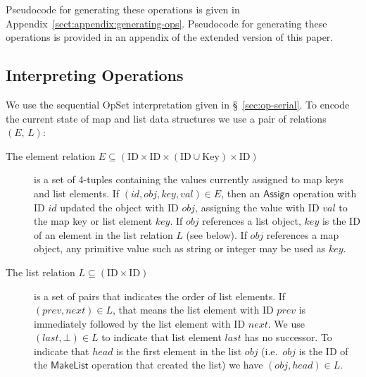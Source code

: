 \ifarxiv
  \noindent
  Pseudocode for generating these operations is given in Appendix~\ref{sect:appendix:generating-ops}.
\else
  \noindent
  Pseudocode for generating these operations is provided in an appendix of the extended version of this paper.
\fi


\subsection{Interpreting Operations}\label{sec:datatypes-interp}

We use the sequential OpSet interpretation given in \S~\ref{sec:op-serial}.
To encode the current state of map and list data structures we use a pair of relations $(E,\, L)$:

\begin{description}
    \item[The element relation $E \subseteq (\mathrm{ID} \times \mathrm{ID} \times (\mathrm{ID} \cup \mathrm{Key}) \times \mathrm{ID})$]
        is a set of 4-tuples containing the values currently assigned to map keys and list elements.
        If $(\mathit{id}, \mathit{obj}, \mathit{key}, \mathit{val}) \in E$, then an $\mathsf{Assign}$ operation with ID $\mathit{id}$ updated the object with ID $\mathit{obj}$, assigning the value with ID $\mathit{val}$ to the map key or list element $\mathit{key}$.
        If $\mathit{obj}$ references a list object, $\mathit{key}$ is the ID of an element in the list relation $L$ (see below).
        If $\mathit{obj}$ references a map object, any primitive value such as string or integer may be used as $\mathit{key}$.
    \item[The list relation $L \subseteq (\mathrm{ID} \times \mathrm{ID})$] is a set of pairs that indicates the order of list elements.
        If $(\mathit{prev}, \mathit{next}) \in L$, that means the list element with ID $\mathit{prev}$ is immediately followed by the list element with ID $\mathit{next}$.
        We use $(\mathit{last}, \bot) \in L$ to indicate that list element $\mathit{last}$ has no successor.
        To indicate that $\mathit{head}$ is the first element in the list $\mathit{obj}$ (i.e.\ $\mathit{obj}$ is the ID of the $\mathsf{MakeList}$ operation that created the list) we have $(\mathit{obj}, \mathit{head}) \in L$.
\end{description}

